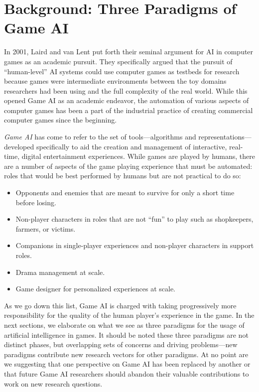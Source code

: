 \documentclass[conference]{IEEEtran}
\begin{document}

\section{Background: Three Paradigms of Game AI}


In 2001, Laird and van Lent \cite{laird2001:gameai} put forth their seminal argument for AI in computer games as an academic pursuit. 
They specifically argued that the pursuit of ``human-level'' AI systems could use computer games as testbeds for research because games were intermediate environments between the toy domains researchers had been using and the full complexity of the real world.
While this opened Game AI as an academic endeavor, the automation of various aspects of computer games has been a part of the industrial practice of creating commercial computer games since the beginning. 

{\em Game AI} has come to refer to the set of tools---algorithms and representations---developed specifically to aid the creation and management of interactive, real-time, digital entertainment experiences.
While games are played by humans, there are a number of aspects of the game playing experience that must be automated: roles that would be best performed by humans but are not practical to do so:

\begin{itemize}
\item Opponents and enemies that are meant to survive for only a short time before losing.
\item Non-player characters in roles that are not ``fun'' to play such as shopkeepers, farmers, or victims.
\item Companions in single-player experiences and non-player characters in support roles.
\item Drama management at scale.
\item Game designer for personalized experiences at scale.
\end{itemize}

\noindent
As we go down this list, Game AI is charged with taking progressively more responsibility for the quality of the human player's experience in the game.
%
In the next sections, we elaborate on what we see as three paradigms for the usage of artificial intelligence in games.
It should be noted these three paradigms are not distinct phases, but overlapping sets of concerns and driving problems---new paradigms contribute new research vectors for other paradigms. 
At no point are we suggesting that one perspective on Game AI has been replaced by another or that future Game AI researchers should abandon their valuable contributions to work on new research questions.
\end{document}
